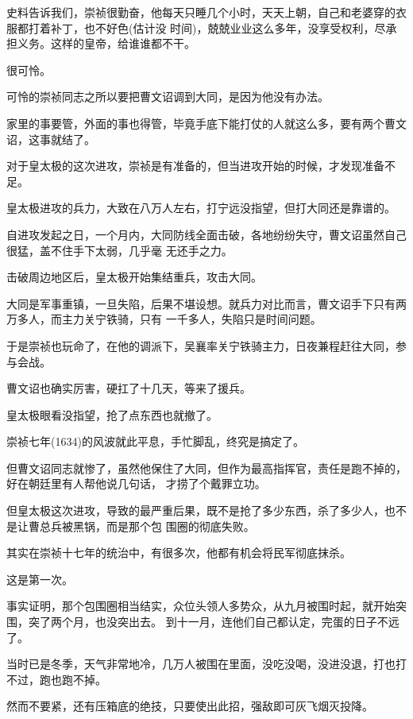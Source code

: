 \documentclass[11pt,a4paper,onecolumn]{article}
\begin{document}
史料告诉我们，崇祯很勤奋，他每天只睡几个小时，天天上朝，自己和老婆穿的衣服都打着补丁，也不好色(估计没
时间)，兢兢业业这么多年，没享受权利，尽承担义务。这样的皇帝，给谁谁都不干。

很可怜。

可怜的崇祯同志之所以要把曹文诏调到大同，是因为他没有办法。

家里的事要管，外面的事也得管，毕竟手底下能打仗的人就这么多，要有两个曹文诏，这事就结了。

对于皇太极的这次进攻，崇祯是有准备的，但当进攻开始的时候，才发现准备不足。

皇太极进攻的兵力，大致在八万人左右，打宁远没指望，但打大同还是靠谱的。

自进攻发起之日，一个月内，大同防线全面击破，各地纷纷失守，曹文诏虽然自己很猛，盖不住手下太弱，几乎毫
无还手之力。

击破周边地区后，皇太极开始集结重兵，攻击大同。

大同是军事重镇，一旦失陷，后果不堪设想。就兵力对比而言，曹文诏手下只有两万多人，而主力关宁铁骑，只有
一千多人，失陷只是时间问题。

于是崇祯也玩命了，在他的调派下，吴襄率关宁铁骑主力，日夜兼程赶往大同，参与会战。

曹文诏也确实厉害，硬扛了十几天，等来了援兵。

皇太极眼看没指望，抢了点东西也就撤了。

崇祯七年(1634)的风波就此平息，手忙脚乱，终究是搞定了。

但曹文诏同志就惨了，虽然他保住了大同，但作为最高指挥官，责任是跑不掉的，好在朝廷里有人帮他说几句话，
才捞了个戴罪立功。

但皇太极这次进攻，导致的最严重后果，既不是抢了多少东西，杀了多少人，也不是让曹总兵被黑锅，而是那个包
围圈的彻底失败。

其实在崇祯十七年的统治中，有很多次，他都有机会将民军彻底抹杀。

这是第一次。

事实证明，那个包围圈相当结实，众位头领人多势众，从九月被围时起，就开始突围，突了两个月，也没突出去。
到十一月，连他们自己都认定，完蛋的日子不远了。

当时已是冬季，天气非常地冷，几万人被围在里面，没吃没喝，没进没退，打也打不过，跑也跑不掉。

然而不要紧，还有压箱底的绝技，只要使出此招，强敌即可灰飞烟灭\myrule 投降。

\section[\thesection]{}
\end{document}
